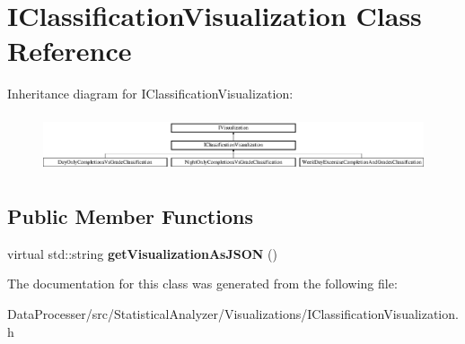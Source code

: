 \hypertarget{classIClassificationVisualization}{}\section{I\+Classification\+Visualization Class Reference}
\label{classIClassificationVisualization}
Inheritance diagram for I\+Classification\+Visualization\+:\begin{figure}[H]
\begin{center}
\leavevmode
\includegraphics[height=1.696970cm]{classIClassificationVisualization}
\end{center}
\end{figure}
\subsection*{Public Member Functions}
\begin{DoxyCompactItemize}
\item 
\mbox{\label{classIClassificationVisualization_a0ccbaa688c997957f8027a0ea74bcc6f}} 
virtual std\+::string {\bfseries get\+Visualization\+As\+J\+S\+ON} ()
\end{DoxyCompactItemize}


The documentation for this class was generated from the following file\+:\begin{DoxyCompactItemize}
\item 
Data\+Processer/src/\+Statistical\+Analyzer/\+Visualizations/I\+Classification\+Visualization.\+h\end{DoxyCompactItemize}
